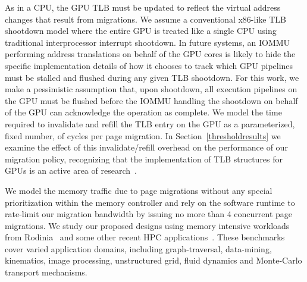 As in a CPU, the GPU TLB must be updated to reflect the virtual address changes that result
from migrations.  We assume a conventional x86-like TLB shootdown model
where the entire GPU is treated like a single CPU using traditional interprocessor interrupt shootdown. 
 In future systems, an IOMMU performing address translations on behalf of the
GPU cores is likely to hide the specific implementation details of how it chooses
to track which GPU pipelines must be stalled and flushed during any given TLB shootdown.
For this work, we make a pessimistic assumption that, upon shootdown, all execution pipelines
on the GPU must be flushed before the IOMMU handling the shootdown on behalf of the GPU
can acknowledge the operation as complete. We model the time required to invalidate and refill 
the TLB entry on the GPU as a parameterized, fixed number, of cycles per page migration. In
Section~\ref{thresholdresults} we examine the effect of this invalidate/refill overhead
on the performance of our migration policy, recognizing that the implementation of TLB
structures for GPUs is an active area of research~\cite{Pichai2014,Power2014}.

We model the memory traffic due to page migrations without any special prioritization within
the memory controller and rely on the software runtime to rate-limit our migration bandwidth
by issuing no more than 4 concurrent page migrations.
We study our proposed designs using memory intensive workloads from
Rodinia~\cite{Che2009} and some other recent HPC
applications~\cite{comd,cns,minife,xsbench}. These benchmarks cover varied 
application domains, including graph-traversal, data-mining, kinematics, image
processing, unstructured grid, fluid dynamics and Monte-Carlo transport
mechanisms.

